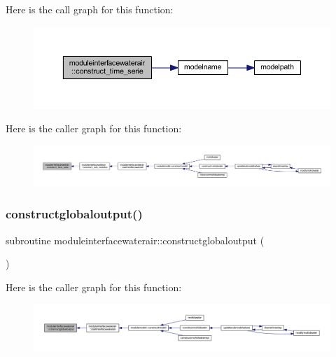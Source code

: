Here is the call graph for this function\+:\nopagebreak
\begin{figure}[H]
\begin{center}
\leavevmode
\includegraphics[width=350pt]{namespacemoduleinterfacewaterair_a49e85ee8a7b283a5ec88a2c8db419d3e_cgraph}
\end{center}
\end{figure}
Here is the caller graph for this function\+:\nopagebreak
\begin{figure}[H]
\begin{center}
\leavevmode
\includegraphics[width=350pt]{namespacemoduleinterfacewaterair_a49e85ee8a7b283a5ec88a2c8db419d3e_icgraph}
\end{center}
\end{figure}
\mbox{\label{namespacemoduleinterfacewaterair_a1512570388fa7585da06c4fd36fc27ae}} 
\subsubsection{\texorpdfstring{constructglobaloutput()}{constructglobaloutput()}}
{\footnotesize\ttfamily subroutine moduleinterfacewaterair\+::constructglobaloutput (\begin{DoxyParamCaption}{ }\end{DoxyParamCaption})\hspace{0.3cm}{\ttfamily [private]}}

Here is the caller graph for this function\+:\nopagebreak
\begin{figure}[H]
\begin{center}
\leavevmode
\includegraphics[width=350pt]{namespacemoduleinterfacewaterair_a1512570388fa7585da06c4fd36fc27ae_icgraph}
\end{center}
\end{figure}
\mbox{\label{namespacemoduleinterfacewaterair_aade4da5319abf6cc9115d08e4cfb448b}} 
